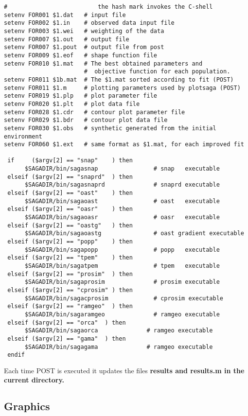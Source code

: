 \documentclass{saclantc}
\begin{document}
\small
\begin{verbatim}
#                          the hash mark invokes the C-shell 
setenv FOR001 $1.dat   # input file
setenv FOR002 $1.in    # observed data input file
setenv FOR003 $1.wei   # weighting of the data 
setenv FOR007 $1.out   # output file
setenv FOR007 $1.pout  # output file from post
setenv FOR009 $1.eof   # shape function file
setenv FOR010 $1.mat   # The best obtained parameters and
                       #  objective function for each population.
setenv FOR011 $1b.mat  # The $1.mat sorted according to fit (POST)
setenv FOR011 $1.m     # plotting parameters used by plotsaga (POST)
setenv FOR019 $1.plp   # plot parameter file
setenv FOR020 $1.plt   # plot data file  
setenv FOR028 $1.cdr   # contour plot parameter file 
setenv FOR029 $1.bdr   # contour plot data file 
setenv FOR030 $1.obs   # synthetic generated from the initial environment
setenv FOR060 $1.ext   # same format as $1.mat, for each improved fit

 if     ($argv[2] == "snap"    ) then
      $SAGADIR/bin/sagasnap                # snap   executable
 elseif ($argv[2] == "snaprd"  ) then
      $SAGADIR/bin/sagasnaprd              # snaprd executable
 elseif ($argv[2] == "oast"    ) then
      $SAGADIR/bin/sagaoast                # oast   executable
 elseif ($argv[2] == "oasr"    ) then
      $SAGADIR/bin/sagaoasr                # oasr   executable
 elseif ($argv[2] == "oastg"   ) then
      $SAGADIR/bin/sagaoastg               # oast gradient executable
 elseif ($argv[2] == "popp"    ) then
      $SAGADIR/bin/sagapopp                # popp   executable
 elseif ($argv[2] == "tpem"    ) then
      $SAGADIR/bin/sagatpem                # tpem   executable
 elseif ($argv[2] == "prosim"  ) then
      $SAGADIR/bin/sagaprosim              # prosim executable
 elseif ($argv[2] == "cprosim" ) then
      $SAGADIR/bin/sagacprosim             # cprosim executable
 elseif ($argv[2] == "ramgeo"  ) then
      $SAGADIR/bin/sagaramgeo              # ramgeo executable
 elseif ($argv[2] == "orca"  ) then
      $SAGADIR/bin/sagaorca              # ramgeo executable
 elseif ($argv[2] == "gama"  ) then
      $SAGADIR/bin/sagagama              # ramgeo executable
 endif
\end{verbatim}
\normalsize

Each time {\sf POST} is executed it updates the files \bf results \rm and
\bf results.m \rm in the current directory.

\subsection{Graphics}  
\label{se:graph}
\end{document}
